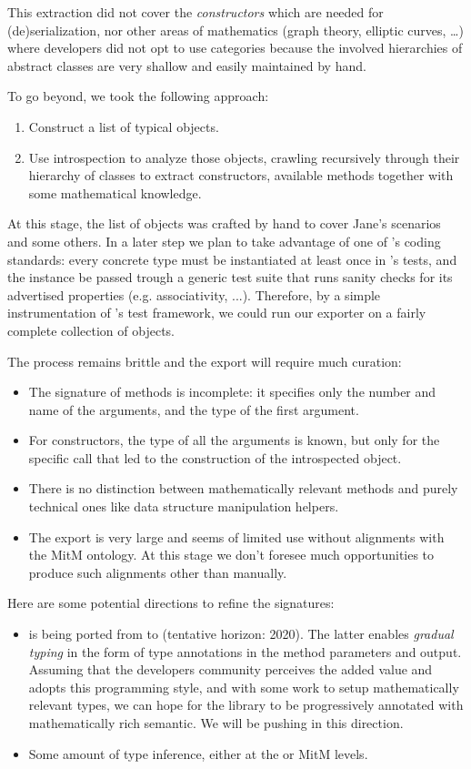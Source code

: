 This extraction did not cover the \emph{constructors} which are needed
for (de)serialization, nor other areas of mathematics (graph theory,
elliptic curves, \ldots) where \Sage developers did not opt to use
categories because the involved hierarchies of abstract classes are
very shallow and easily maintained by hand.

To go beyond, we took the following approach:
\begin{enumerate}
\item Construct a list of typical \Sage objects.
\item Use introspection to analyze those objects, crawling recursively
  through their hierarchy of classes to extract constructors,
  available methods together with some mathematical knowledge.
\end{enumerate}

At this stage, the list of objects was crafted by hand to cover Jane's
scenarios and some others. In a later step we plan to take advantage
of one of \Sage's coding standards: every concrete type must be
instantiated at least once in \Sage's tests, and the instance be passed
trough a generic test suite that runs sanity checks for its advertised
properties (e.g. associativity, ...). Therefore, by a simple
instrumentation of \Sage's test framework, we could run our exporter on
a fairly complete collection of \Sage objects.

The process remains brittle and the export will require much curation:
\begin{itemize}
\item The signature of methods is incomplete: it specifies only the
  number and name of the arguments, and the type of the first
  argument.
\item For constructors, the type of all the arguments is known, but
  only for the specific call that led to the construction of the
  introspected object.
\item There is no distinction between mathematically relevant methods
  and purely technical ones like data structure manipulation helpers.
\item The export is very large and seems of limited use without
  alignments with the MitM ontology. At this stage we don't foresee
  much opportunities to produce such alignments other than manually.
\end{itemize}

Here are some potential directions to refine the signatures:
\begin{itemize}
\item \Sage is being ported from  to  (tentative
  horizon: 2020). The latter enables \emph{gradual typing} in the form
  of type annotations in the method parameters and output. Assuming
  that the \Sage developers community perceives the added value and
  adopts this programming style, and with some work to setup
  mathematically relevant types, we can hope for the \Sage library to
  be progressively annotated with mathematically rich semantic. We
  will be pushing in this direction.
\item Some amount of type inference, either at the \Sage or MitM levels.
\end{itemize}

